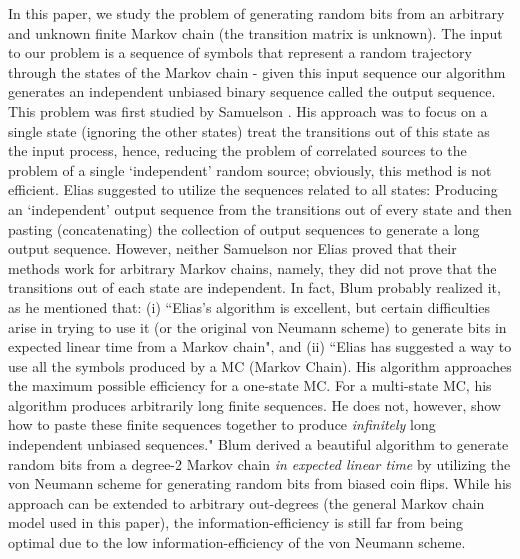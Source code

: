 \documentclass[journal]{IEEEtran}
\begin{document}
In this paper, we study the problem of generating random bits from an arbitrary and unknown finite Markov chain (the transition matrix is unknown). The input to our problem is a sequence of symbols that represent a random trajectory through the states of the Markov chain - given this input sequence our algorithm generates an independent unbiased
binary sequence called the output sequence. This problem was first studied by Samuelson \cite{Samuelson1968}. His approach was to focus on a single state (ignoring the other states) treat the transitions out of this state as the input process, hence, reducing the problem of correlated sources to the problem of a single `independent' random source; obviously, this method is not efficient. Elias \cite{Elias1972} suggested to utilize the sequences related to all states: Producing an `independent' output sequence from the transitions out of every state and then pasting (concatenating) the collection of output sequences to generate a long output sequence. However, neither Samuelson nor Elias proved that their methods work for arbitrary Markov chains, namely, they did not prove that the transitions out of each state are independent. In fact, Blum \cite{Blum1986} probably
realized it, as he mentioned that: (i) ``Elias's algorithm is excellent, but certain difficulties arise in trying to use it (or the original von Neumann scheme) to generate bits in expected linear time from a Markov chain", and (ii) ``Elias has suggested a way to use all the symbols produced by a MC (Markov Chain). His algorithm approaches the maximum possible efficiency for a one-state MC. For a multi-state MC, his algorithm produces arbitrarily long finite sequences. He does not, however, show how to paste these finite sequences together to produce \emph{infinitely} long independent unbiased sequences."
Blum \cite{Blum1986} derived a beautiful algorithm to generate random bits from a degree-2 Markov chain \emph{in expected linear time} by utilizing the  von Neumann scheme for generating random bits from biased coin flips. While his approach can be extended to arbitrary out-degrees (the general Markov chain model used in this paper), the information-efficiency is still far from being optimal due to the low information-efficiency of the von Neumann scheme.
\end{document}
